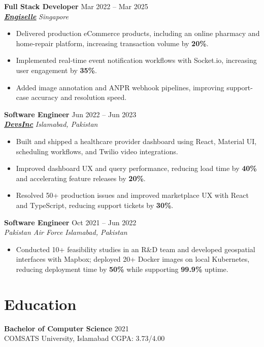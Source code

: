 \documentclass[9pt,letterpaper]{article}
\newcommand{\role}[4]{\textbf{#1} \hfill #2 \\
\textit{#3} \hfill \textit{#4}\\[-4pt]}
\begin{document}
\role{Full Stack Developer}{Mar 2022 -- Mar 2025}{\href{https://www.engiselle.com/}{\textbf{\underline{Engiselle}}}}{Singapore}
\begin{itemize}[leftmargin=*, itemsep=0pt, topsep=0pt, partopsep=0pt, parsep=0pt, after=\vspace{2pt}]
  \item Delivered production eCommerce products, including an online pharmacy and home-repair platform, increasing transaction volume by \textbf{20\%}.
  \item Implemented real-time event notification workflows with Socket.io, increasing user engagement by \textbf{35\%}.
  \item Added image annotation and ANPR webhook pipelines, improving support-case accuracy and resolution speed.
\end{itemize}

\role{Software Engineer}{Jun 2022 -- Jun 2023}{\href{https://www.devsinc.com/}{\textbf{\underline{DevsInc}}}}{Islamabad, Pakistan}
\begin{itemize}[leftmargin=*, itemsep=0pt, topsep=0pt, partopsep=0pt, parsep=0pt, after=\vspace{2pt}]
  \item Built and shipped a healthcare provider dashboard using React, Material UI, scheduling workflows, and Twilio video integrations.
  \item Improved dashboard UX and query performance, reducing load time by \textbf{40\%} and accelerating feature releases by \textbf{20\%}.
  \item Resolved 50+ production issues and improved marketplace UX with React and TypeScript, reducing support tickets by \textbf{30\%}.
\end{itemize}

\role{Software Engineer}{Oct 2021 -- Jun 2022}{Pakistan Air Force}{Islamabad, Pakistan}
\begin{itemize}[leftmargin=*, itemsep=0pt, topsep=0pt, partopsep=0pt, parsep=0pt, after=\vspace{2pt}]
  \item Conducted 10+ feasibility studies in an R\&D team and developed geospatial interfaces with Mapbox; deployed 20+ Docker images on local Kubernetes, reducing deployment time by \textbf{50\%} while supporting \textbf{99.9\%} uptime.
\end{itemize}

\section*{Education}
\textbf{Bachelor of Computer Science} \hfill 2021 \\
COMSATS University, Islamabad \hfill CGPA: 3.73/4.00
\end{document}
